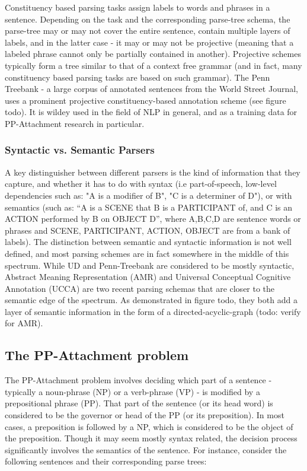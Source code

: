 Constituency based parsing tasks assign labels to words and phrases in a sentence. Depending on the task and the corresponding parse-tree schema, the parse-tree may or may not cover the entire sentence, contain multiple layers of labels, and in the latter case - it may or may not be projective (meaning that a labeled phrase cannot only be partially contained in another). Projective schemes typically form a tree similar to that of a context free grammar (and in fact, many constituency based parsing tasks are based on such grammar). The Penn Treebank - a large corpus of annotated sentences from the World Street Journal, uses a prominent projective constituency-based annotation scheme (see figure todo). It is wildey used in the field of NLP in general, and as a training data for PP-Attachment research in particular.

\subsubsection{Syntactic vs. Semantic Parsers}

A key distinguisher between different parsers is the kind of information that they capture, and whether it has to do with syntax (i.e part-of-speech, low-level dependencies such as: "A is a modifier of B", "C is a determiner of D"), or with semantics (such as: “A is a SCENE that B is a PARTICIPANT of, and C is an ACTION performed by B on OBJECT D”, where A,B,C,D are sentence words or phrases and SCENE, PARTICIPANT, ACTION, OBJECT are from a bank of labels). The distinction between semantic and syntactic information is not well defined, and most parsing schemes are in fact somewhere in the middle of this spectrum. While UD and Penn-Treebank are considered to be mostly syntactic, Abstract Meaning Representation (AMR) and Universal Conceptual Cognitive Annotation (UCCA) are two recent parsing schemas that are closer to the semantic edge of the spectrum. As demonstrated in figure todo, they both add a layer of semantic information in the form of a directed-acyclic-graph (todo: verify for AMR). 

\subsection{The PP-Attachment problem}

The PP-Attachment problem involves deciding which part of a sentence  - typically a noun-phrase (NP) or a verb-phrase (VP) - is modified by a prepositional phrase (PP). That part of the sentence (or its head word) is considered to be the governor or head of the PP (or its preposition). In most cases, a preposition is followed by a NP, which is considered to be the object of the preposition. Though it may seem mostly syntax related, the decision process significantly involves the semantics of the sentence. For instance, consider the following sentences and their corresponding parse trees: 


